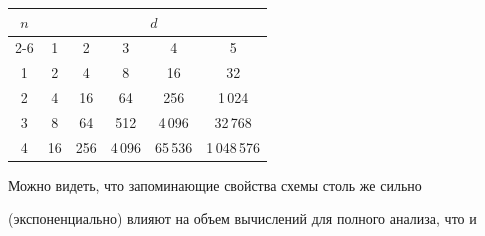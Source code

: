 \begin{table}\small %


\begin{center}


\parbox{228pt}{





}





\vspace*{2ex}





\tabcolsep=9pt


\begin{tabular}{|c|c|c|c|c|c|}


\hline


$n$&\multicolumn{5}{c|}{$d$}\\


\cline{2-6}


&1&2&3&4&5\\


\hline





1&\hphantom{9}2&\hphantom{99}4& \hphantom{999\,}8&\hphantom{999\,}16&\hphantom{99999\,}32\\


2&\hphantom{9}4&\hphantom{9}16&    \hphantom{\,99}64&\hphantom{99\,}256&\hphantom{999\,}1\,024\\


3&\hphantom{9}8&\hphantom{9}64&   \hphantom{9\,}512& \hphantom{9}4\,096&\hphantom{99\,}32\,768\\


4&16&256&4\,096&65\,536&1\,048\,576\\


\hline


\end{tabular}


\end{center}


\end{table}





Можно видеть, что запоминающие свойства схемы столь же сильно 


(экспоненциально) влияют на объем вычислений для полного анализа, что и 


